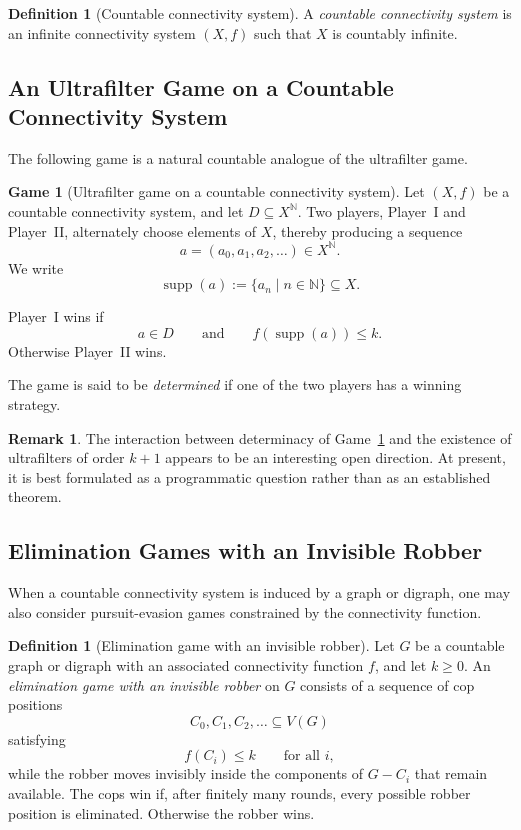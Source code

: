 \documentclass[10pt]{book}
\theoremstyle{definition}
\newtheorem{remark}[theorem]{Remark}
\newtheorem{definition}[theorem]{Definition}
\newtheorem{game}[theorem]{Game}
\begin{document}
\begin{definition}[Countable connectivity system]
A \emph{countable connectivity system} is an infinite connectivity system \((X,f)\) such that \(X\) is countably infinite.
\end{definition}

\subsection{An Ultrafilter Game on a Countable Connectivity System}
The following game is a natural countable analogue of the ultrafilter game.

\begin{game}[Ultrafilter game on a countable connectivity system]
\label{game:ultrafilter_countable}
Let \((X,f)\) be a countable connectivity system, and let \(D\subseteq X^{\mathbb{N}}\).
Two players, Player~I and Player~II, alternately choose elements of \(X\), thereby producing a sequence
\[
a=(a_0,a_1,a_2,\dots)\in X^{\mathbb{N}}.
\]
We write
\[
\operatorname{supp}(a):=\{a_n \mid n\in \mathbb{N}\}\subseteq X.
\]

Player~I wins if
\[
a\in D
\qquad\text{and}\qquad
f(\operatorname{supp}(a))\leq k.
\]
Otherwise Player~II wins.

The game is said to be \emph{determined} if one of the two players has a winning strategy.
\end{game}

\begin{remark}
The interaction between determinacy of Game~\ref{game:ultrafilter_countable} and the existence of ultrafilters of order \(k+1\) appears to be an interesting open direction.
At present, it is best formulated as a programmatic question rather than as an established theorem.
\end{remark}

\subsection{Elimination Games with an Invisible Robber}
When a countable connectivity system is induced by a graph or digraph, one may also consider pursuit-evasion games constrained by the connectivity function.

\begin{definition}[Elimination game with an invisible robber]
Let \(G\) be a countable graph or digraph with an associated connectivity function \(f\), and let \(k\geq 0\).
An \emph{elimination game with an invisible robber} on \(G\) consists of a sequence of cop positions
\[
C_0,C_1,C_2,\dots \subseteq V(G)
\]
satisfying
\[
f(C_i)\leq k
\qquad\text{for all } i,
\]
while the robber moves invisibly inside the components of \(G-C_i\) that remain available.
The cops win if, after finitely many rounds, every possible robber position is eliminated.
Otherwise the robber wins.
\end{definition}
\end{document}
